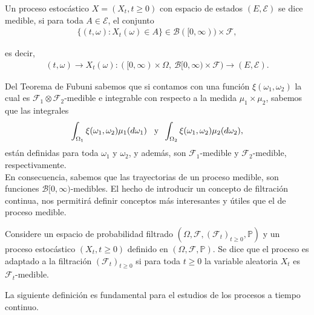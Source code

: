 \begin{definition}
	Un proceso estocástico $X = (X_t, t \geq 0)$ con espacio de estados $(E, \mathcal{E})$ se dice medible, si para toda $A \in \mathcal{E}$, el conjunto
	\begin{align*}
	\{ (t, \omega) : X_t (\omega) \in A \} \in \mathcal{B}([0, \infty)) \times \mathcal{F},
	\end{align*}  
    
    
	es decir,
	\begin{align*}
	(t, \omega) \rightarrow X_t(\omega) : ([0, \infty) \times \Omega, \ \mathcal{B}[0, \infty) \times \mathcal{F} ) \rightarrow (E, \mathcal{E}).
	\end{align*}
\end{definition}

Del Teorema de Fubuni sabemos que si contamos con una función $\xi(\omega_1, \omega_2)$ la cual es $\mathcal{F}_1 \otimes \mathcal{F}_2$-medible e integrable con respecto a la medida $\mu_1 \times \mu_2$, sabemos que las integrales
\begin{align*}
  \int_{\Omega_1} \xi(\omega_1, \omega_2) \mu_1(d \omega_1) \hspace{0.3cm} \text{y} \hspace{0.2cm} \int_{\Omega_2} \xi(\omega_1, \omega_2) \mu_2(d \omega_2),
\end{align*}
están definidas para toda $\omega_1$ y $\omega_2$, y además, son $\mathcal{F}_1$-medible y $\mathcal{F}_2$-medible, respectivamente. \\

En consecuencia, sabemos que las trayectorias de un proceso medible, son funciones $\mathcal{B}[0, \infty)$-medibles. El hecho de introducir un concepto de filtración continua, nos permitirá definir conceptos más interesantes y útiles que el de proceso medible.

\begin{definition}
	Considere un espacio de probabilidad filtrado  $(\Omega, \mathcal{F}, (\mathcal{F}_t)_{t \geq 0}, \mathbb{P})$ y un proceso estocástico $(X_t, t \geq 0)$ definido en  $(\Omega, \mathcal{F}, \mathbb{P})$. Se dice que el proceso es adaptado a la filtración $(\mathcal{F}_t)_{t \geq 0}$ si para toda $t \geq 0$ la variable aleatoria $X_t$ es $\mathcal{F}_t$-medible.
\end{definition}

La siguiente definición es fundamental para el estudios de los procesos a tiempo continuo.

